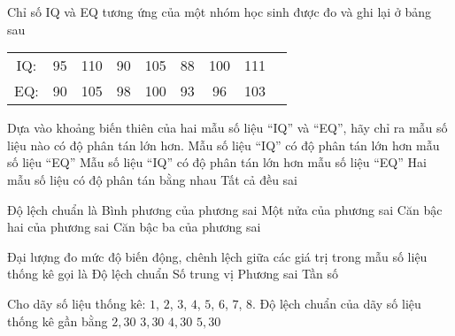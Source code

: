 \begin{ex}%
	Chỉ số IQ và EQ tương ứng của một nhóm học sinh được đo và ghi lại ở bảng sau
	\begin{longtable}{ccccccccc}
		IQ: & 95 & 110 & 90 & 105 & 88 & 100 & 111\\
		EQ: & 90 & 105 & 98 & 100 & 93 & 96 & 103\\
	\end{longtable}
	Dựa vào khoảng biến thiên của hai mẫu số liệu ``IQ'' và ``EQ'', hãy chỉ ra mẫu số liệu nào có độ phân tán lớn hơn.
	\choice
	{\True Mẫu số liệu ``IQ'' có độ phân tán lớn hơn mẫu số liệu ``EQ''}
	{Mẫu số liệu ``IQ'' có độ phân tán lớn hơn mẫu số liệu ``EQ''}
	{Hai mẫu số liệu có độ phân tán bằng nhau}
	{Tất cả đều sai}
\end{ex}

\begin{ex}%
	Độ lệch chuẩn là
	\choice
	{Bình phương của phương sai}
	{Một nửa của phương sai}
	{\True Căn bậc hai của phương sai}
	{Căn bậc ba của phương sai}
\end{ex}

\begin{ex}%
	Đại lượng đo mức độ biến động, chênh lệch giữa các giá trị trong mẫu số liệu thống kê gọi là
	\choice
	{Độ lệch chuẩn}
	{Số trung vị}
	{\True Phương sai}
	{Tần số}
\end{ex}

\begin{ex}%
	Cho dãy số liệu thống kê: $1$, $2$, $3$, $4$, $5$, $6$, $7$, $8$. Độ lệch chuẩn của dãy số liệu thống kê gần bằng
	\choice
	{\True $2{,}30$}
	{$3{,}30$}
	{$4{,}30$}
	{$5{,}30$}
\end{ex}

